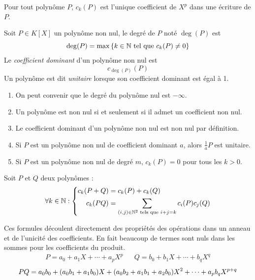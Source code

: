 \begin{frame}
\begin{defi}
 Pour tout polynôme $P$, $c_k(P)$ est l'unique coefficient de $X^p$ dans une écriture de $P$.
\end{defi}
\begin{defi}[degré]
 Soit $P\in K[X]$ un polynôme non nul, le degré de $P$ noté $\deg(P)$ est
\begin{displaymath}
 \deg(P)=\max \left\lbrace k\in\mathbb{N} \text{ tel que } c_k(P)\neq 0 \right\rbrace 
\end{displaymath}
Le \emph{coefficient dominant} d'un polynôme non nul est 
\begin{displaymath}
 c_{\deg(P)}(P)
\end{displaymath}
Un polynôme est dit \emph{unitaire} lorsque son coefficient dominant est égal à 1.
\end{defi}
 \end{frame}

\begin{rems}
\begin{enumerate}
 \item On peut convenir que le degré du polynôme nul est $-\infty$.
 \item Un polynôme est non nul si et seulement si il admet un coefficient non nul.
 \item Le coefficient dominant d'un polynôme non nul est non nul par définition.
 \item Si $P$ est un polynôme non nul de coefficient dominant $a$, alors $\frac{1}{a}P$ est unitaire.
 \item Si $P$ est un polynôme non nul de degré $m$, $c_k(P)=0$ pour tous les $k>0$. 
\end{enumerate}
\end{rems}

\begin{frame}
\begin{prop}
 Soit $P$ et $Q$ deux polynômes :
\begin{displaymath}
 \forall k\in \mathbb{N} : \left\lbrace 
\begin{aligned}
 c_k(P+Q) &= c_k(P)+c_k(Q) \\
 c_k(PQ) &= \sum_{(i,j)\in\mathbb{N}^2 \text{ tels que } i+j=k } c_i(P)c_j(Q) 
\end{aligned}
\right. 
\end{displaymath}
\end{prop}
\end{frame}
\begin{demo}
Ces formules découlent directement des propriétés des opérations dans un anneau et de l'unicité des coefficients. En fait beaucoup de termes sont nuls dans les sommes pour les coefficients du produit.
\begin{align*}
 P=a_0+a_1X + \cdots + a_pX^p & & Q=b_0+b_1X + \cdots + b_qX^q
\end{align*}
\begin{displaymath}
 PQ = a_0b_0 + (a_0b_1 + a_1b_0)X + (a_0b_2+a_1b_1+a_2b_0)X^2 + \cdots + a_pb_q X^{p+q} \\
\end{displaymath} 
\end{demo}

